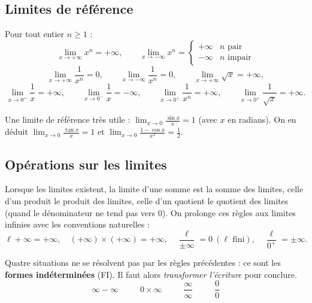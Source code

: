 \subsection{Limites de référence}

\begin{propriete}
Pour tout entier $n\ge1$ :
\[
\lim_{x\to+\infty}x^{n}=+\infty,\qquad
\lim_{x\to-\infty}x^{n}=
\begin{cases}+\infty & n\text{ pair}\\ -\infty & n\text{ impair}\end{cases}
\]
\[
\lim_{x\to+\infty}\frac1{x^{n}}=0,\qquad
\lim_{x\to-\infty}\frac1{x^{n}}=0,\qquad
\lim_{x\to+\infty}\sqrt{x}=+\infty,
\]
\[
\lim_{x\to0^{+}}\frac1x=+\infty,\qquad
\lim_{x\to0^{-}}\frac1x=-\infty,\qquad
\lim_{x\to0^{+}}\frac1{x^{n}}=+\infty,\qquad
\lim_{x\to0^{+}}\frac1{\sqrt x}=+\infty.
\]
\end{propriete}

\begin{remarque}
Une limite de référence très utile : $\displaystyle\lim_{x\to0}\frac{\sin x}{x}=1$ (avec $x$ en radians). On en déduit $\displaystyle\lim_{x\to0}\frac{\tan x}{x}=1$ et $\displaystyle\lim_{x\to0}\frac{1-\cos x}{x^{2}}=\frac12$.
\end{remarque}

\subsection{Opérations sur les limites}

\begin{theoreme}
Lorsque les limites existent, la limite d'une somme est la somme des limites, celle d'un produit le produit des limites, celle d'un quotient le quotient des limites (quand le dénominateur ne tend pas vers $0$). On prolonge ces règles aux limites infinies avec les conventions naturelles :
\[
\ell+\infty=+\infty,\quad (+\infty)\times(+\infty)=+\infty,\quad \frac{\ell}{\pm\infty}=0\ (\ell\text{ fini}),\quad \frac{\ell}{0^{+}}=\pm\infty.
\]
\end{theoreme}

\begin{theoreme}
Quatre situations ne se résolvent pas par les règles précédentes : ce sont les \textbf{formes indéterminées} (FI). Il faut alors \emph{transformer l'écriture} pour conclure.
\[
\boxed{\;\infty-\infty\;}\qquad\boxed{\;0\times\infty\;}\qquad\boxed{\;\dfrac{\infty}{\infty}\;}\qquad\boxed{\;\dfrac{0}{0}\;}
\]
\end{theoreme}

